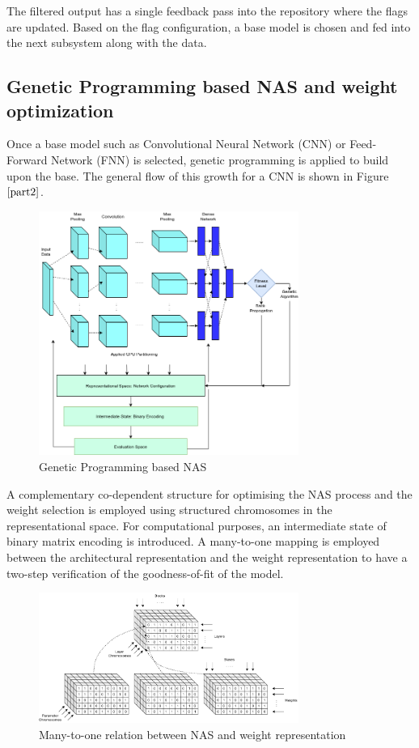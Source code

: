 \documentclass[conference]{IEEEtran}
\begin{document}
The filtered output has a single feedback pass into the repository where the flags are updated. Based on the flag configuration, a base model is chosen and fed into the next subsystem along with the data. 

\subsection{Genetic Programming based NAS and weight optimization}

Once a base model such as Convolutional Neural Network (CNN) or Feed-Forward Network (FNN) is selected, genetic programming is applied to build upon the base. The general flow of this growth for a CNN is shown in Figure $\ref{part2}$. 

\begin{figure}[!b]
\centerline{\includegraphics[width=85mm]{part2.png}}
\caption{Genetic Programming based NAS}
\label{part2}
\end{figure}

A complementary co-dependent structure for optimising the NAS process and the weight selection is employed using structured chromosomes in the representational space. For computational purposes, an intermediate state of binary matrix encoding is introduced. A many-to-one mapping is employed between the architectural representation and the weight representation to have a two-step verification of the goodness-of-fit of the model.

\begin{figure}[!b]
\centerline{\includegraphics[width=85mm]{part3.png}}
\caption{Many-to-one relation between NAS and weight representation}
\label{part3}
\end{figure}
\end{document}
